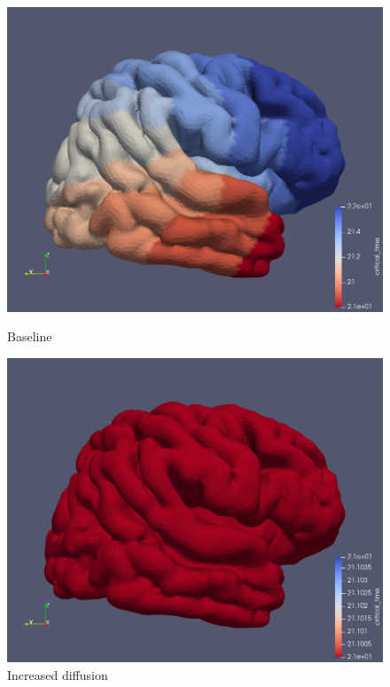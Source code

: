 \documentclass[12pt, letterpaper]{article}
\begin{document}
\begin{figure}[]
    \centering
    \begin{minipage}{0.4\textwidth}
        \centering
        \includegraphics[width=\linewidth]{pics/base.png}
        \caption{Baseline}
    \end{minipage}
    \hfill
    \begin{minipage}{0.4\textwidth}
        \centering
        \includegraphics[width=\linewidth]{pics/incdiff.png}
        \caption{Increased diffusion}
    \end{minipage}
    

\end{figure}
\end{document}
